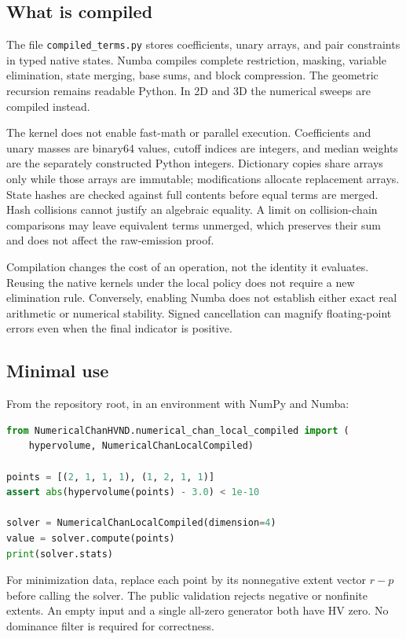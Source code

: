 \documentclass[12pt,a4paper]{article}
\theoremstyle{definition}
\begin{document}
\subsection{What is compiled}
The file \texttt{compiled\_terms.py} stores coefficients, unary arrays,
and pair constraints in typed native states. Numba compiles complete
restriction, masking, variable elimination, state merging, base sums,
and block compression. The geometric recursion remains readable Python.
In 2D and 3D the numerical sweeps are compiled instead.

The kernel does not enable fast-math or parallel execution. Coefficients
and unary masses are binary64 values, cutoff indices are integers, and
median weights are the separately constructed Python integers. Dictionary
copies share arrays only while those arrays are immutable; modifications
allocate replacement arrays. State hashes are checked against full
contents before equal terms are merged. Hash collisions cannot justify
an algebraic equality. A limit on collision-chain comparisons may leave
equivalent terms unmerged, which preserves their sum and does not affect
the raw-emission proof.

Compilation changes the cost of an operation, not the identity it
evaluates. Reusing the native kernels under the local policy does not
require a new elimination rule. Conversely, enabling Numba does not
establish either exact real arithmetic or numerical stability. Signed
cancellation can magnify floating-point errors even when the final
indicator is positive.

\subsection{Minimal use}
From the repository root, in an environment with NumPy and Numba:
\begin{lstlisting}[language=Python]
from NumericalChanHVND.numerical_chan_local_compiled import (
    hypervolume, NumericalChanLocalCompiled)

points = [(2, 1, 1, 1), (1, 2, 1, 1)]
assert abs(hypervolume(points) - 3.0) < 1e-10

solver = NumericalChanLocalCompiled(dimension=4)
value = solver.compute(points)
print(solver.stats)
\end{lstlisting}
For minimization data, replace each point by its nonnegative extent
vector $r-p$ before calling the solver. The public validation rejects
negative or nonfinite extents. An empty input and a single all-zero
generator both have HV zero. No dominance filter is required for correctness.
\end{document}
